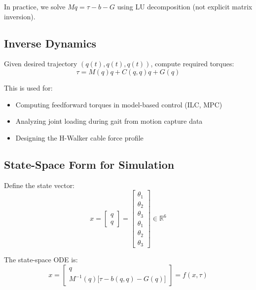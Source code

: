 \documentclass[11pt,a4paper]{article}
\newcommand{\vc}[1]{\bm{#1}}
\newcommand{\mat}[1]{\bm{#1}}
\newcommand{\dt}[1]{\dot{#1}}
\newcommand{\ddt}[1]{\ddot{#1}}
\def\vc#1{#1}%
\def\mat#1{#1}%
\def\dt#1{#1}%
\def\ddt#1{#1}%
\def\bm#1{#1}%
\begin{document}
In practice, we solve $\mat{M}\ddt{\vc{q}} = \vc{\tau} - \vc{b} - \vc{G}$
using LU decomposition (not explicit matrix inversion).

\subsection{Inverse Dynamics}

Given desired trajectory $(\vc{q}(t), \dt{\vc{q}}(t), \ddt{\vc{q}}(t))$,
compute required torques:
\begin{equation}
\boxed{
    \vc{\tau} = \mat{M}(\vc{q})\ddt{\vc{q}} + \vc{C}(\vc{q},\dt{\vc{q}})\dt{\vc{q}} + \vc{G}(\vc{q})
}
\label{eq:inverse_dynamics}
\end{equation}

This is used for:
\begin{itemize}
    \item Computing feedforward torques in model-based control (ILC, MPC)
    \item Analyzing joint loading during gait from motion capture data
    \item Designing the H-Walker cable force profile
\end{itemize}

\subsection{State-Space Form for Simulation}

Define the state vector:
\begin{equation}
    \vc{x} = \begin{bmatrix} \vc{q} \\ \dt{\vc{q}} \end{bmatrix}
    = \begin{bmatrix} \theta_1 \\ \theta_2 \\ \theta_3 \\ \dt{\theta}_1 \\ \dt{\theta}_2 \\ \dt{\theta}_3 \end{bmatrix}
    \in \mathbb{R}^6
\end{equation}

The state-space ODE is:
\begin{equation}
    \dt{\vc{x}} = \begin{bmatrix} \dt{\vc{q}} \\ \mat{M}^{-1}(\vc{q})\bigl[\vc{\tau} - \vc{b}(\vc{q},\dt{\vc{q}}) - \vc{G}(\vc{q})\bigr] \end{bmatrix}
    = \vc{f}(\vc{x}, \vc{\tau})
    \label{eq:state_space}
\end{equation}
\end{document}
